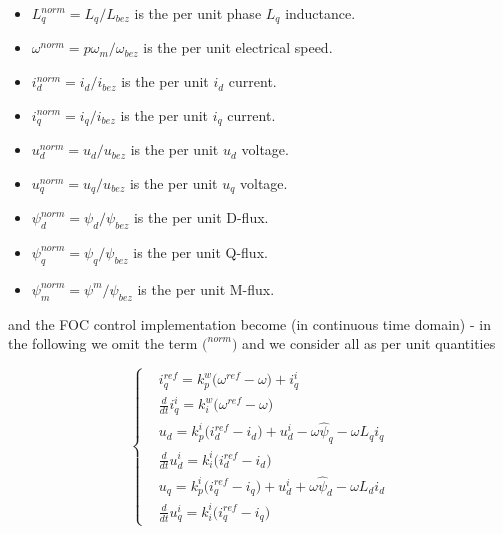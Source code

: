\documentclass[12pt,a4paper]{scrartcl}
\begin{document}
\begin{onehalfspace}
\begin{itemize}
\begin{itemize}
		\item[--] $L_q^{norm} = L_q/L_{bez}$ is the per unit phase $L_q$ inductance.
		\item[--] $\omega^{norm} = p\omega_m/\omega_{bez}$ is the per unit electrical speed.		
		\item[--] $i_d^{norm} = i_d/i_{bez}$ is the per unit $i_d$ current.
		\item[--] $i_q^{norm} = i_q/i_{bez}$ is the per unit $i_q$ current.
		\item[--] $u_d^{norm} = u_d/u_{bez}$ is the per unit $u_d$ voltage.
		\item[--] $u_q^{norm} = u_q/u_{bez}$ is the per unit $u_q$ voltage.		
		\item[--] $\psi_d^{norm} = \psi_d/\psi_{bez}$ is the per unit D-flux.
		\item[--] $\psi_q^{norm} = \psi_q/\psi_{bez}$ is the per unit Q-flux.
		\item[--] $\psi_m^{norm} = \psi^m/\psi_{bez}$ is the per unit M-flux.
		\end{itemize}	 
\end{itemize}
and the FOC control implementation become (in continuous time domain) - in the following we omit the term $\Big(^{norm}\Big)$ and we consider all as per unit quantities
\begin{mybox}
\begin{equation}
	\left\lbrace \begin{aligned}
		&i_q^{ref} = k_p^w\Big(\omega^{ref} - \omega\Big) + i_{q}^{i} \\[6pt]
		&\frac{d}{dt} i_{q}^{i}= k_i^w\Big(\omega^{ref} - \omega\Big) \\[6pt]
		&u_d =  k_p^i\Big(i_d^{ref} - i_d\Big) + u_d^i - \omega\hat{\psi}_q - \omega L_q i_q \\[6pt]
		&\frac{d}{dt} u_d^i= k_i^i\Big(i_d^{ref} - i_d\Big)\\[6pt]
		&u_q =  k_p^i\Big(i_q^{ref} - i_q\Big) + u_d^i + \omega\hat{\psi}_d - \omega L_d i_d \\[6pt]
		&\frac{d}{dt} u_q^i= k_i^i\Big(i_q^{ref} - i_q\Big)
	\end{aligned}\right. 
\end{equation}
\end{mybox}


\end{onehalfspace}
\end{document}
